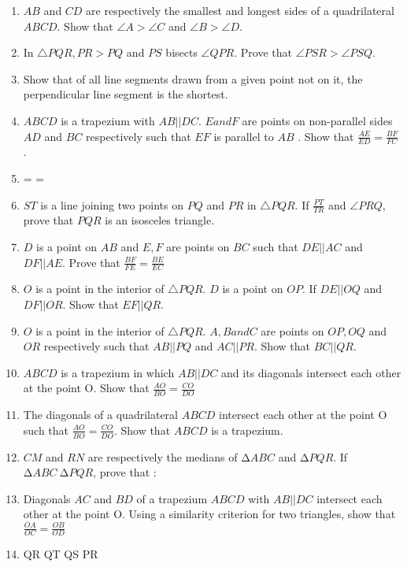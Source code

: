 \begin{enumerate}[label=\arabic*.,ref=\thesubsection.\theenumi]
\item $AB$ and $CD$ are respectively the smallest and longest sides of a quadrilateral $ABCD$. Show that $\angle  A > \angle  C$ and $\angle  B > \angle  D$.
%
\item In $\triangle PQR,  PR > PQ$ and $PS$ bisects $\angle  QPR$. Prove that $\angle  PSR > \angle  PSQ$.
%
\item Show that of all line segments drawn from a given point not on it, the perpendicular line segment is the shortest.
%
\item $ABCD$ is a trapezium with $AB || DC$. $E and F$ are points on non-parallel sides $AD$ and $BC$ respectively such that $EF$ is parallel to $AB$
. Show that
$\frac{AE}{ED}=\frac{ BF}{  FC}$ .
\item {} =
=
\item $ST$ is a line joining two points on $PQ$ and $PR$ in $\triangle PQR$.  If $\frac{PT}{ TR}$ and $∠ PRQ$, prove that $PQR$ is an isosceles triangle.
\item $D$ is a point on $AB$ and $E, F$ are points on $BC$ such that $DE || AC$ and $DF || AE$. Prove that $\frac{BF} {FE} =\frac{BE}  {EC}$
%
\item $O$ is a point in the interior of $\triangle PQR$. $D$ is a point on $OP$.  If $DE || OQ$ and $DF || OR$. Show that $EF || QR$.
\item $O$ is a point in the interior of $\triangle PQR$.  $A, B and C$ are points on $OP, OQ$ and $OR$ respectively such that $AB || PQ$ and $AC || PR$. Show that $BC || QR$.
%
\item $ABCD$ is a trapezium in which $AB || DC$ and its diagonals intersect each other at the point O. Show
that
$\frac{AO}{ BO}=\frac{CO}{  DO}$
%
\item The diagonals of a quadrilateral $ABCD$ intersect each other at the point O such that $\frac{AO}{ BO}=\frac{CO}{  DO}$.
 Show that $ABCD$ is a trapezium.
 \item $CM$ and $RN$ are respectively the medians of $∆ ABC$ and $∆ PQR$. If $∆ ABC ~ ∆ PQR$, prove that :
\begin{enumerate}
(i) $∆ AMC ~ ∆ PNR$ 
(ii) \frac{CM}{RN{=\frac{ AB}{  PQ}
\item $∆ CMB ~ ∆ RNQ$
%
\end{enumerate}
\item Diagonals $AC$ and $BD$ of a trapezium $ABCD$ with $AB || DC$ intersect each other at the point O. Using a similarity criterion for two triangles, show that
$\frac{OA}{OC} =  \frac{OB}  {OD}$
%
\item QR QT QS PR

\end{enumerate}
